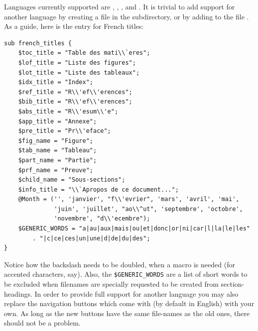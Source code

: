 %
\html{\\}%
Languages currently supported are 
, , , 
 and .
It is trivial to add support for another language by creating a file
in the  subdirectory, 
or by adding to the file .
As a guide, here is the entry for French titles:
\begin{small}
\begin{verbatim}
sub french_titles {
    $toc_title = "Table des mati\\`eres";
    $lof_title = "Liste des figures";
    $lot_title = "Liste des tableaux";
    $idx_title = "Index";
    $ref_title = "R\\'ef\\'erences";
    $bib_title = "R\\'ef\\'erences";
    $abs_title = "R\\'esum\\'e";
    $app_title = "Annexe";
    $pre_title = "Pr\\'eface";
    $fig_name = "Figure";
    $tab_name = "Tableau";
    $part_name = "Partie";
    $prf_name = "Preuve";
    $child_name = "Sous-sections";
    $info_title = "\\`Apropos de ce document...";
    @Month = ('', 'janvier', "f\\'evrier", 'mars', 'avril', 'mai',
              'juin', 'juillet', "ao\\^ut", 'septembre', 'octobre',
              'novembre', "d\\'ecembre");
    $GENERIC_WORDS = "a|au|aux|mais|ou|et|donc|or|ni|car|l|la|le|les"
        . "|c|ce|ces|un|une|d|de|du|des";
}
\end{verbatim}
\end{small}
Notice how the backslash needs to be doubled, when a macro is needed
(for accented characters, say).
Also, the \texttt{\$GENERIC\_WORDS} are a list of short words to be excluded
when filenames are specially requested to be created from section-headings.
In order to provide full support for another language you may also
replace the navigation buttons which come with \latextohtml{} 
(by default in English) with your own. 
As long as the new buttons have the same file-names as the old ones, 
there should not be a problem.


